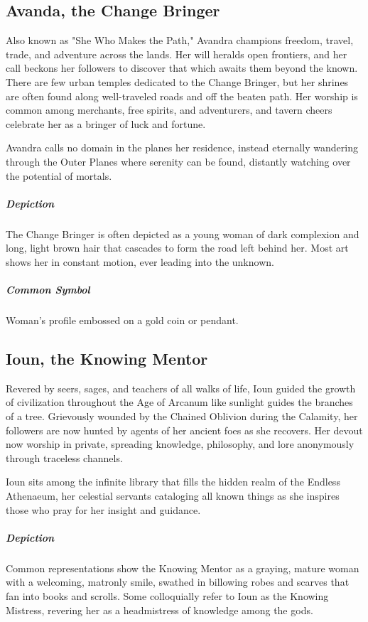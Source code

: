 \documentclass[letterpaper, twocolumn, openany, nodeprecatedcode, layout=true]{dndbook}
\begin{document}
\subsection{Avanda, the Change Bringer}

Also known as "She Who Makes the Path," Avandra champions freedom, travel, trade, and
adventure across the lands. Her will heralds open frontiers, and her call beckons her
followers to discover that which awaits them beyond the known. There are few urban temples
dedicated to the Change Bringer, but her shrines are often found along well-traveled roads
and off the beaten path. Her worship is common among merchants, free spirits, and adventurers,
and tavern cheers celebrate her as a bringer of luck and fortune.

Avandra calls no domain in the planes her residence, instead eternally wandering through the
Outer Planes where serenity can be found, distantly watching over the potential of mortals.

\subparagraph{Depiction}
The Change Bringer is often depicted as a young woman of dark complexion and long, light brown
hair that cascades to form the road left behind her. Most art shows her in constant motion,
ever leading into the unknown.

\subparagraph{Common Symbol}
Woman’s profile embossed on a gold coin or pendant.

\subsection{Ioun, the Knowing Mentor}

Revered by seers, sages, and teachers of all walks of life, Ioun guided the growth of
civilization throughout the Age of Arcanum like sunlight guides the branches of a tree.
Grievously wounded by the Chained Oblivion during the Calamity, her followers are now
hunted by agents of her ancient foes as she recovers. Her devout now worship in private,
spreading knowledge, philosophy, and lore anonymously through traceless channels.

Ioun sits among the infinite library that fills the hidden realm of the Endless Athenaeum,
her celestial servants cataloging all known things as she inspires those who pray for
her insight and guidance.

\subparagraph{Depiction}
Common representations show the Knowing Mentor as a graying, mature woman with a welcoming,
matronly smile, swathed in billowing robes and scarves that fan into books and scrolls.
Some colloquially refer to Ioun as the Knowing Mistress, revering her as a headmistress
of knowledge among the gods.
\end{document}
